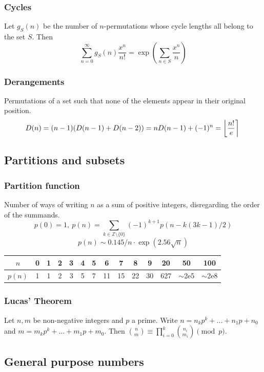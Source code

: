 	\subsubsection{Cycles}
		Let $g_S(n)$ be the number of $n$-permutations whose cycle lengths all belong to the set $S$. Then
		$$\sum_{n=0} ^\infty g_S(n) \frac{x^n}{n!} = \exp\left(\sum_{n\in S} \frac{x^n} {n} \right)$$

	\subsubsection{Derangements}
		Permutations of a set such that none of the elements appear in their original position.
		\[ \mkern-2mu D(n) = (n-1)(D(n-1)+D(n-2)) = n D(n-1)+(-1)^n = \left\lfloor\frac{n!}{e}\right\rceil \]

\subsection{Partitions and subsets}
	\subsubsection{Partition function}
		Number of ways of writing $n$ as a sum of positive integers, disregarding the order of the summands.
		\[ p(0) = 1,\ p(n) = \sum_{k \in \mathbb Z \setminus \{0\}}{(-1)^{k+1} p(n - k(3k-1) / 2)} \]
		\[ p(n) \sim 0.145 / n \cdot \exp(2.56 \sqrt{n}) \]

		\begin{center}
		\begin{tabular}{c|c@{\ }c@{\ }c@{\ }c@{\ }c@{\ }c@{\ }c@{\ }c@{\ }c@{\ }c@{\ }c@{\ }c@{\ }c}
			$n$    & 0 & 1 & 2 & 3 & 4 & 5 & 6  & 7  & 8  & 9  & 20  & 50  & 100 \\ \hline
			$p(n)$ & 1 & 1 & 2 & 3 & 5 & 7 & 11 & 15 & 22 & 30 & 627 & $\mathtt{\sim}$2e5 & $\mathtt{\sim}$2e8 \\
		\end{tabular}
		\end{center}

	\subsubsection{Lucas' Theorem}
		Let $n,m$ be non-negative integers and $p$ a prime. Write $n=n_kp^k+...+n_1p+n_0$ and $m=m_kp^k+...+m_1p+m_0$. Then $\binom{n}{m} \equiv \prod_{i=0}^k\binom{n_i}{m_i} \pmod{p}$.

\subsection{General purpose numbers}
